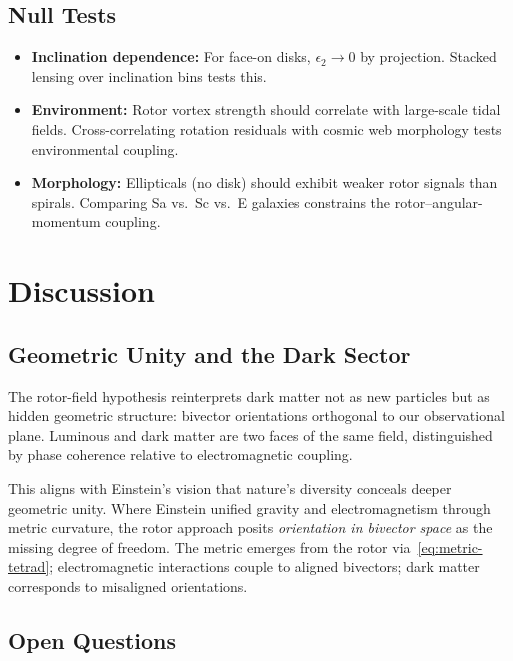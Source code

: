 \documentclass[11pt,a4paper]{article}
\numberwithin{equation}{section}
\theoremstyle{plain}
\theoremstyle{definition}
\theoremstyle{remark}
\begin{document}
\subsection{Null Tests}

\begin{itemize}[leftmargin=*]
  \item \textbf{Inclination dependence:} For face-on disks, $\epsilon_2\to 0$ by projection. Stacked lensing over inclination bins tests this.
  \item \textbf{Environment:} Rotor vortex strength should correlate with large-scale tidal fields. Cross-correlating rotation residuals with cosmic web morphology tests environmental coupling.
  \item \textbf{Morphology:} Ellipticals (no disk) should exhibit weaker rotor signals than spirals. Comparing Sa vs.\ Sc vs.\ E galaxies constrains the rotor--angular-momentum coupling.
\end{itemize}

\vspace{1em}

\section{Discussion}\label{sec:discussion}

\subsection{Geometric Unity and the Dark Sector}

The rotor-field hypothesis reinterprets dark matter not as new particles but as hidden geometric structure: bivector orientations orthogonal to our observational plane. Luminous and dark matter are two faces of the same field, distinguished by phase coherence relative to electromagnetic coupling.

This aligns with Einstein's vision that nature's diversity conceals deeper geometric unity. Where Einstein unified gravity and electromagnetism through metric curvature, the rotor approach posits \emph{orientation in bivector space} as the missing degree of freedom. The metric emerges from the rotor via~\eqref{eq:metric-tetrad}; electromagnetic interactions couple to aligned bivectors; dark matter corresponds to misaligned orientations.

\subsection{Open Questions}
\end{document}
